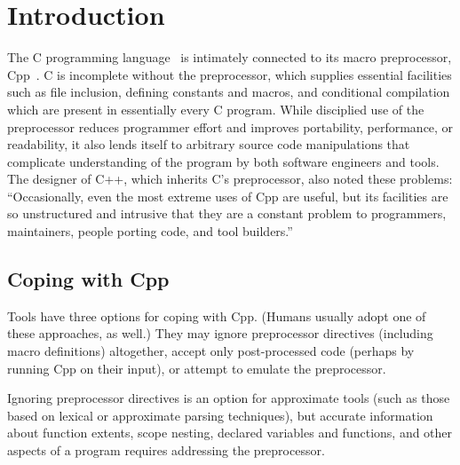 \documentclass[11pt]{article}
\begin{document}
\bigskip

\section{Introduction}

The C programming language~\cite{ansi} is intimately connected to its macro
preprocessor, Cpp~\cite[Ch.~3]{Harbison91}.   C is incomplete without the
preprocessor, which supplies essential 
facilities such as file inclusion, defining constants and macros, and
conditional compilation which are present in essentially every C program.
While disciplied use of  the preprocessor reduces programmer effort and 
improves portability, performance, or readability, it also lends itself to
arbitrary source code manipulations that complicate understanding of the
program by both software engineers and tools.  The designer of C++, which
inherits C's preprocessor, also noted these problems:
``Occasionally, even the most extreme uses of Cpp are useful, but its
facilities are so unstructured and intrusive that they are a constant
problem to programmers, maintainers, people porting code, and tool
builders.''~\cite[p.~424]{Stroustrup-DesignEvolution}

\subsection{Coping with Cpp}

Tools have three options for coping with Cpp.  (Humans usually adopt one of
these approaches, as well.)  They may ignore preprocessor directives
(including macro definitions) altogether, accept only post-processed code
(perhaps by running Cpp on their input), or attempt to emulate the
preprocessor.

Ignoring preprocessor directives is an option for approximate tools (such
as those based on lexical or approximate parsing techniques), but accurate
information about function extents, scope nesting, declared variables and
functions, and other aspects of a program requires addressing the
preprocessor.
\end{document}
